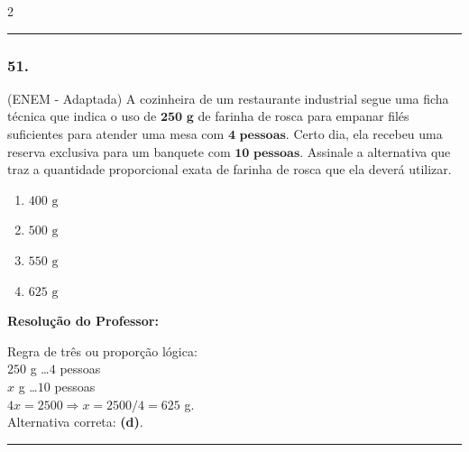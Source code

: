 \begin{multicols*}{2}
\noindent\textcolor{CorLinha}{\rule{\linewidth}{0.5pt}} 
\par\vspace{\espacoPreQuestao}
\subsubsection*{51.} (ENEM - Adaptada) A cozinheira de um restaurante industrial segue uma ficha técnica que indica o uso de $ \textbf{250 g} $ de farinha de rosca para empanar filés suficientes para atender uma mesa com $ \textbf{4 pessoas} $. Certo dia, ela recebeu uma reserva exclusiva para um banquete com $ \textbf{10 pessoas} $. Assinale a alternativa que traz a quantidade proporcional exata de farinha de rosca que ela deverá utilizar.
\begin{enumerate}[label=\alph*), itemsep=\espacoAlt]
    \item $ 400 \text{ g} $
    \item $ 500 \text{ g} $
    \item $ 550 \text{ g} $
    \item $ 625 \text{ g} $
\end{enumerate}

\ifgabarito
    \begin{tcolorbox}[colback=CorTitUm!5, colframe=CorTitUm, boxrule=1pt, arc=4pt, left=6pt, right=6pt, top=6pt, bottom=6pt]
    \small\textbf{\textcolor{CorTitUm}{Resolução do Professor:}}\par\vspace{0.1cm}
    \color{CinzaEscuro}
    Regra de três ou proporção lógica:\\
    $ 250 $ g \dots $ 4 $ pessoas\\
    $ x $ g \dots $ 10 $ pessoas\\
    $ 4x = 2500 \Rightarrow x = 2500 / 4 = 625 $ g.\\
    Alternativa correta: \textbf{(d)}.
    \end{tcolorbox}
\fi

\par\vspace{\espacoQuestao}

\noindent\textcolor{CorLinha}{\rule{\linewidth}{0.5pt}} 
\par\vspace{\espacoPreQuestao}

\end{multicols*}
